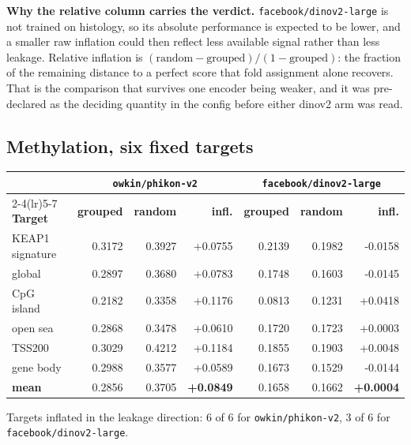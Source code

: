 \documentclass[11pt,a4paper]{article}
\begin{document}
\textbf{Why the relative column carries the verdict.} \texttt{facebook/dinov2-large} is not trained on
histology, so its absolute performance is expected to be lower, and a smaller raw inflation could
then reflect less available signal rather than less leakage. Relative inflation is
$(\text{random} - \text{grouped}) / (1 - \text{grouped})$: the fraction of the remaining
distance to a perfect score that fold assignment alone recovers. That is the comparison that
survives one encoder being weaker, and it was pre-declared as the deciding quantity in the config
before either dinov2 arm was read.

\subsection{Methylation, six fixed targets}

\begin{center}
\small
\begin{tabular}{@{}lrrrrrr@{}}
\toprule
& \multicolumn{3}{c}{\texttt{owkin/phikon-v2}} & \multicolumn{3}{c}{\texttt{facebook/dinov2-large}} \\
\cmidrule(lr){2-4}\cmidrule(lr){5-7}
\textbf{Target} & \textbf{grouped} & \textbf{random} & \textbf{infl.} &
\textbf{grouped} & \textbf{random} & \textbf{infl.} \\
\midrule
KEAP1 signature & 0.3172 & 0.3927 & +0.0755 & 0.2139 & 0.1982 & -0.0158 \\
global & 0.2897 & 0.3680 & +0.0783 & 0.1748 & 0.1603 & -0.0145 \\
CpG island & 0.2182 & 0.3358 & +0.1176 & 0.0813 & 0.1231 & +0.0418 \\
open sea & 0.2868 & 0.3478 & +0.0610 & 0.1720 & 0.1723 & +0.0003 \\
TSS200 & 0.3029 & 0.4212 & +0.1184 & 0.1855 & 0.1903 & +0.0048 \\
gene body & 0.2988 & 0.3577 & +0.0589 & 0.1673 & 0.1529 & -0.0144 \\
\midrule
\textbf{mean} & 0.2856 & 0.3705 &
\textbf{+0.0849} & 0.1658 &
0.1662 & \textbf{+0.0004} \\
\bottomrule
\end{tabular}
\end{center}

Targets inflated in the leakage direction: 6 of 6 for
\texttt{owkin/phikon-v2}, 3 of 6 for \texttt{facebook/dinov2-large}.
\end{document}
